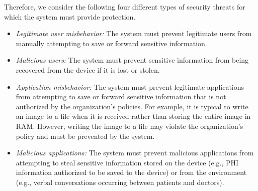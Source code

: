 Therefore, we consider the following four different types of security
threats for which the system must provide protection. 

\begin{itemize}
\item \textit{Legitimate user misbehavior:} The system must prevent legitimate
users from manually attempting to save or forward sensitive information.
\item \textit{Malicious users:} The system must prevent sensitive information
from being recovered from the device if it is lost or stolen.
\item \textit{Application misbehavior:} The system must prevent legitimate
applications from attempting to save or forward sensitive information that is
not authorized by the organization's policies. For example, it is typical to
write an image to a file when it is received rather than storing the entire
image in RAM. However, writing the image to a file may violate the
organization's policy and must be prevented by the system.
\item \textit{Malicious applications:} The system must prevent malicious
applications from attempting to steal sensitive information stored on the
device (e.g., PHI information authorized to be saved to the device) or from the
environment (e.g., verbal conversations occurring between patients and
doctors).
\end{itemize}

